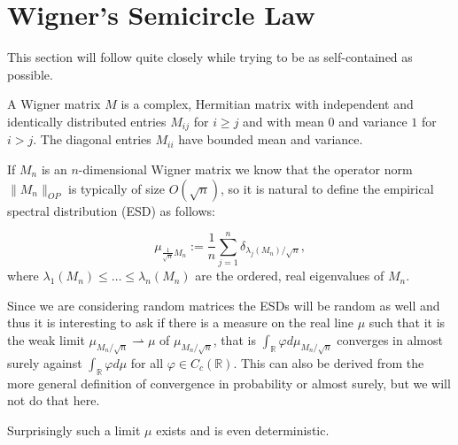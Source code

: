 

\section{Wigner's Semicircle Law}
This section will follow \cite{TaoWSCL} quite closely while trying to be as self-contained as possible.

\begin{definition}
	A Wigner matrix $M$ is a complex, Hermitian matrix with independent and identically distributed entries $M_{ij}$ for $i\geq j$ and with mean $0$ and variance $1$ for $i>j$. The diagonal entries $M_{ii}$ have bounded mean and variance.
\end{definition}

If $M_n$ is an $n$-dimensional Wigner matrix we know that the operator norm $\|M_n\|_{OP}$ is typically of size $O(\sqrt n)$, so it is natural to define the empirical spectral distribution (ESD) as follows:

\begin{definition}[ESD]
	\begin{equation*}
		\mu_{\frac{1}{\sqrt{n}}M_n}:=\frac{1}{n}\sum_{j=1}^n \delta_{\lambda_j(M_n)/\sqrt{n}},
	\end{equation*}
	where $\lambda_1(M_n)\leq\dots\leq\lambda_n(M_n)$ are the ordered, real eigenvalues of $M_n$.
\end{definition}

Since we are considering random matrices the ESDs will be random as well and thus it is interesting to ask if there is a measure on the real line $\mu$ such that it is the weak limit $\mu_{M_n/\sqrt{n}}\rightharpoonup\mu$ of $\mu_{M_n/\sqrt{n}}$, that is $\int_\mathbb{R} \varphi d\mu_{M_n/\sqrt{n}}$ converges in almost surely against $\int_\mathbb{R} \varphi d\mu$ for all $\varphi\in C_c(\mathbb R)$. This can also be derived from the more general definition of convergence in probability or almost surely, but we will not do that here.

Surprisingly such a limit $\mu$ exists and is even deterministic.

